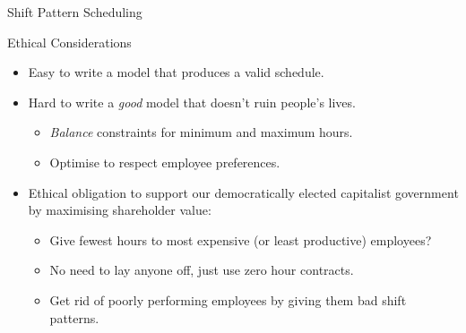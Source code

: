 \documentclass[aspectratio=169,compress,10pt]{beamer}
\begin{document}
\begin{frame}[fragile]{Shift Pattern Scheduling}
    \vspace*{-0.5em}%
    \only<5>{}%
\end{frame}

\begin{frame}{Ethical Considerations}
    \begin{itemize}
        \item Easy to write a model that produces a valid schedule.
        \item Hard to write a \emph{good} model that doesn't ruin people's lives.
            \begin{itemize}
                \item \emph{Balance} constraints for minimum and maximum hours.
                \item Optimise to respect employee preferences.
            \end{itemize}
        \item <2-> Ethical obligation to support our democratically elected
            capitalist government by maximising shareholder value:
            \begin{itemize}
                \item <2-> Give fewest hours to most expensive (or least productive) employees?
                \item <2-> No need to lay anyone off, just use zero hour contracts.
                \item <2-> Get rid of poorly performing employees by giving them
                    bad shift patterns.
            \end{itemize}
    \end{itemize}
\end{frame}
\end{document}
